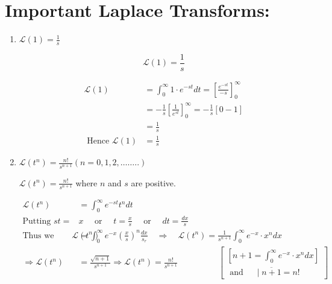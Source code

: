 \section{Important Laplace Transforms:}
\begin{enumerate}
	\item $\mathcal{L}(1)=\frac{1}{s}$
	\begin{exercise}
		$$
		\mathcal{L}(1)=\frac{1}{s}
		$$
	\end{exercise}
	\begin{answer}
		\begin{align*}
		\mathcal{L}(1)&=\int_{0}^{\infty} 1 \cdot e^{-s t} d t=\left[\frac{e^{-s t}}{-s}\right]_{0}^{\infty}\\&=-\frac{1}{s}\left[\frac{1}{e^{s t}}\right]_{0}^{\infty}=-\frac{1}{s}[0-1]\\&=\frac{1}{s}\\
		\text{ Hence }\mathcal{L}(1)&=\frac{1}{s}
		\end{align*}
	\end{answer}
	\item $\mathcal{L}\left(t^{n}\right)=\frac{n !}{s^{n+1}}(n=0,1,2, \ldots \ldots . .)$
	\begin{exercise}
		$\mathcal{L}\left(t^{n}\right)=\frac{n !}{s^{n+1}}$ where $n$ and $s$ are positive.
	\end{exercise}
	\begin{answer}
		\begin{align*}
		\mathcal{L}\left(t^{n}\right)&=\int_{0}^{\infty} e^{-s t} t^{n} d t\\
		\text{Putting }s t=&x \quad\text{ or }\quad t=\frac{x}{s} \quad\text{ or } \quad d t=\frac{d x}{s}\\
		\text{Thus we have}\mathcal{L}\left(t^{n}\right)&=\int_{0}^{\infty} e^{-x}\left(\frac{x}{s}\right)^{n} \frac{d x}{s_{r}} \quad \Rightarrow \quad \mathcal{L}\left(t^{n}\right)=\frac{1}{s^{n+1}} \int_{0}^{\infty} e^{-x} \cdot x^{n} d x\\
		\Rightarrow \mathcal{L}\left(t^{n}\right)&=\frac{\sqrt{n+1}}{s^{n+1}} \Rightarrow \mathcal{L}\left(t^{n}\right)=\frac{n !}{s^{n+1}}\hspace{2cm}\left[\begin{array}{c}
		{\left[n+1=\int_{0}^{\infty} e^{-x} \cdot x^{n} d x\right] } \\
		\text { and } \quad \mid \overline{n+1}=n !
		\end{array}\right]
		\end{align*}
	\end{answer}

\end{enumerate}
